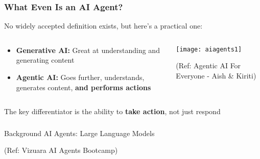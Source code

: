 \begin{frame}[fragile]\frametitle{What Even Is an AI Agent?}
No widely accepted definition exists, but here's a practical one:

\begin{columns}
    \begin{column}[T]{0.6\linewidth}
		\begin{itemize}
			\item \textbf{Generative AI:} Great at understanding and generating content
			\item \textbf{Agentic AI:} Goes further, understands, generates content, \textbf{and performs actions}
		\end{itemize}

    \end{column}
    \begin{column}[T]{0.4\linewidth}
        \begin{center}
        \texttt{[image: aiagents1]}
		
		{\tiny (Ref: Agentic AI For Everyone - Aish \& Kiriti)}
        \end{center}
    \end{column}
  \end{columns}
  
The key differentiator is the ability to \textbf{take action}, not just respond  
\end{frame}


\begin{frame}[fragile]\frametitle{}
\begin{center}
{\Large Background AI Agents: Large Language Models}

{\tiny (Ref: Vizuara AI Agents Bootcamp)}
\end{center}
\end{frame}

